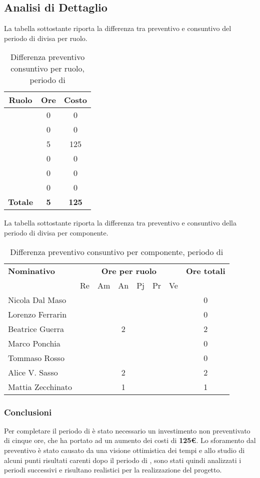 \subsection{Analisi di Dettaglio}
La tabella sottostante riporta la differenza tra preventivo e consuntivo del periodo di \AD{} divisa per ruolo.
\begin{table}[H]
	\centering
	\begin{tabular}{|c|c|c|}
		\hline
		\textbf{Ruolo} &
		\textbf{Ore} &
		\textbf{Costo} \\
		\hline
		\Responsabile & 0 & 0\\
		\hline
		\Amministratore & 0 & 0\\
		\hline
		\Analista & 5 & 125\\
		\hline
		\Progettista & 0 & 0 \\
		\hline
		\Verificatore & 0 & 0\\
		\hline
		\Programmatore & 0 & 0 \\
		\hline
		\textbf{Totale} & \textbf{5} & \textbf{125} \\
		\hline
	\end{tabular}
	\caption{Differenza preventivo consuntivo per ruolo, periodo di \AD}
\end{table}

La tabella sottostante riporta la differenza tra preventivo e consuntivo della periodo di \AD{} divisa per componente.
\begin{table}[H]
	\centering
	\begin{tabular}{|l|c|c|c|c|c|c|c|}
		\hline
		\textbf{Nominativo} & 
		\multicolumn{6}{c|}{\textbf{Ore per ruolo}} & 
		\textbf{Ore totali} \\
		& Re & Am & An & Pj & Pr & Ve & \\
		\hline
		Nicola Dal Maso & & & & & & & 0 \\
		Lorenzo Ferrarin & & & & & & & 0 \\
		Beatrice Guerra & & &2 & & & & 2 \\
		Marco Ponchia & & & & & & & 0 \\
		Tommaso Rosso & & & & & & & 0 \\
		Alice V. Sasso & & & 2& & & & 2 \\
		Mattia Zecchinato & & &1 & & & & 1  \\
		\hline
	\end{tabular}
	\caption{Differenza preventivo consuntivo per componente, periodo di \AD}
\end{table}
\subsubsection{Conclusioni}
Per completare il periodo di \AD{} è stato necessario un investimento non preventivato di cinque ore, che ha portato ad un aumento dei costi di \textbf{125€}. Lo sforamento dal preventivo è stato causato da una visione ottimistica dei tempi e allo studio di alcuni punti risultati carenti dopo il periodo di \AR{}, sono stati quindi analizzati i periodi successivi e risultano realistici per la realizzazione del progetto.
